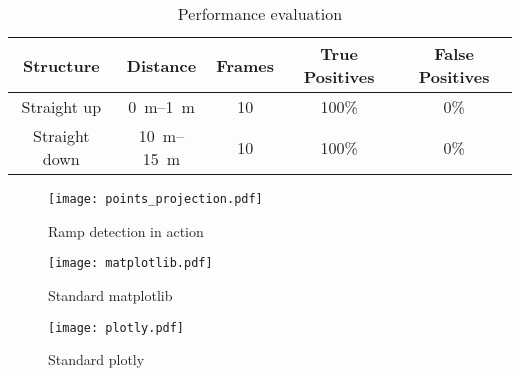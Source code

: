 \begin{table}[htbp]
	\centering
	\caption{Performance evaluation}
	\label{tab:lidar_datasheets}
	\begin{tabular}[t]{ccccc}
		\toprule
		\textbf{Structure}  & \textbf{Distance}         & \textbf{Frames}   & \textbf{True Positives}   & \textbf{False Positives} \\
		\midrule
		Straight up         & \SIrange{0}{1}{\metre}    & 10                & 100\%	                    & 0\% \\
		Straight down       & \SIrange{10}{15}{\metre}  & 10                & 100\%	                    & 0\% \\
		\bottomrule
	\end{tabular}
\end{table}
						
						


\begin{figure}[htbp]
    \centering
    \texttt{[image: points\_projection.pdf]}
    \caption{Ramp detection in action}
\end{figure}

\begin{figure}[htbp]
    \centering
    \texttt{[image: matplotlib.pdf]}
    \caption{Standard matplotlib}
\end{figure}

\begin{figure}[htbp]
    \centering
    \texttt{[image: plotly.pdf]}
    \caption{Standard plotly}
\end{figure}